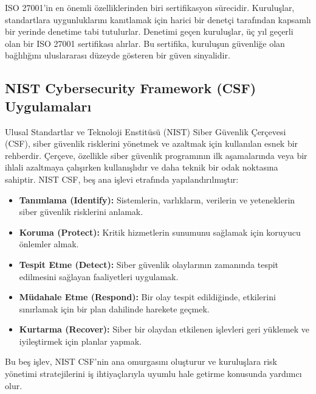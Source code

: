 ISO 27001'in en önemli özelliklerinden biri sertifikasyon sürecidir. Kuruluşlar, standartlara uygunluklarını kanıtlamak için harici bir denetçi tarafından kapsamlı bir yerinde denetime tabi tutulurlar. Denetimi geçen kuruluşlar, üç yıl geçerli olan bir ISO 27001 sertifikası alırlar. Bu sertifika, kuruluşun güvenliğe olan bağlılığını uluslararası düzeyde gösteren bir güven sinyalidir.

\subsection{NIST Cybersecurity Framework (CSF) Uygulamaları}

Ulusal Standartlar ve Teknoloji Enstitüsü (NIST) Siber Güvenlik Çerçevesi (CSF), siber güvenlik risklerini yönetmek ve azaltmak için kullanılan esnek bir rehberdir. Çerçeve, özellikle siber güvenlik programının ilk aşamalarında veya bir ihlali azaltmaya çalışırken kullanışlıdır ve daha teknik bir odak noktasına sahiptir. NIST CSF, beş ana işlevi etrafında yapılandırılmıştır:

\begin{itemize}
    \item \textbf{Tanımlama (Identify):} Sistemlerin, varlıkların, verilerin ve yeteneklerin siber güvenlik risklerini anlamak.
    \item \textbf{Koruma (Protect):} Kritik hizmetlerin sunumunu sağlamak için koruyucu önlemler almak.
    \item \textbf{Tespit Etme (Detect):} Siber güvenlik olaylarının zamanında tespit edilmesini sağlayan faaliyetleri uygulamak.
    \item \textbf{Müdahale Etme (Respond):} Bir olay tespit edildiğinde, etkilerini sınırlamak için bir plan dahilinde harekete geçmek.
    \item \textbf{Kurtarma (Recover):} Siber bir olaydan etkilenen işlevleri geri yüklemek ve iyileştirmek için planlar yapmak.
\end{itemize}

Bu beş işlev, NIST CSF'nin ana omurgasını oluşturur ve kuruluşlara risk yönetimi stratejilerini iş ihtiyaçlarıyla uyumlu hale getirme konusunda yardımcı olur.

